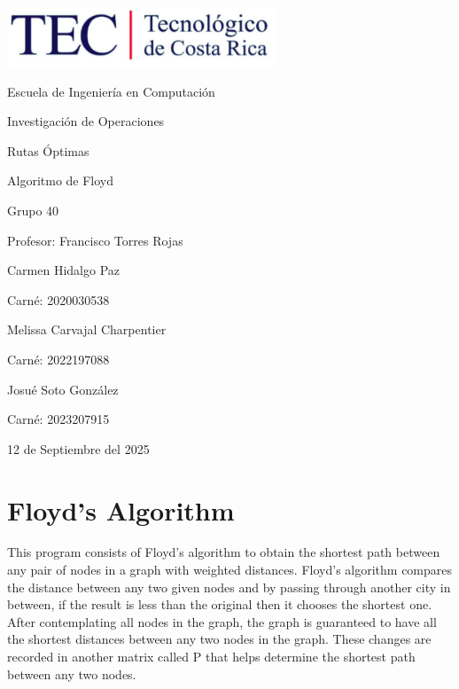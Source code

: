 \documentclass{article}
\begin{document}
\begin{titlepage}
    \centering
    \includegraphics[width=0.6\textwidth]{logo-tec.png}\par\vspace{1cm}

    {\large Escuela de Ingenier\'ia en Computaci\'on\par}
    {\large Investigaci\'on de Operaciones\par}
    \vspace{2cm}

    {\Large Rutas \'Optimas\par}
    {\large Algoritmo de Floyd\par}
    \vspace{2cm}

    {\large Grupo 40\par}
    {\large Profesor: Francisco Torres Rojas\par}
    \vspace{3cm}

    {\large Carmen Hidalgo Paz\par}
    {\large Carn\'e: 2020030538\par}
    \vspace{1cm}
    {\large Melissa Carvajal Charpentier\par}
    {\large Carn\'e: 2022197088\par}
    \vspace{1cm}
    {\large Josu\'e Soto Gonz\'alez\par}
    {\large Carn\'e: 2023207915\par}
    \vspace{1cm}

    {\large 12 de Septiembre del 2025\par}
\end{titlepage}

\newpage


\section{Floyd's Algorithm}
This program consists of Floyd's algorithm to obtain the shortest path between any pair of nodes in a graph with weighted distances.
Floyd's algorithm compares the distance between any two given nodes and by passing through another city in between, if the result is less than the original then it chooses the shortest one. After contemplating all nodes in the graph, the graph is guaranteed to have all the shortest distances between any two nodes in the graph. These changes are recorded in another matrix called P that helps determine the shortest path between any two nodes.
\end{document}
